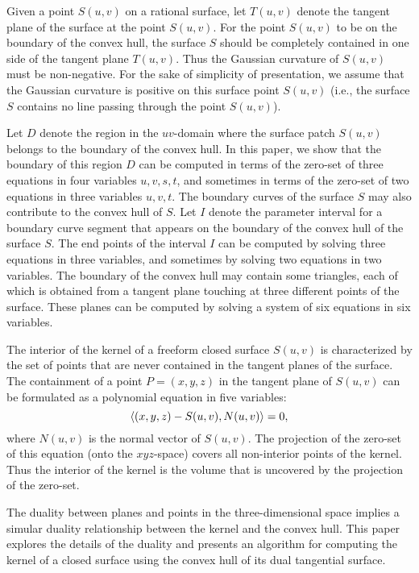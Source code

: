 \documentclass[doublespacing]{elsart}
\begin{document}
Given a point $S(u,v)$ on a rational surface, let $T(u,v)$ denote
the tangent plane of the surface at the point $S(u,v)$.
For the point $S(u,v)$ to be on the boundary of the convex hull,
the surface $S$ should be completely contained in one side of
the tangent plane $T(u,v)$.  Thus the Gaussian curvature of $S(u,v)$ 
must be non-negative.  For the sake of simplicity of presentation,
we assume that the Gaussian curvature is positive
on this surface point $S(u,v)$ (i.e., the surface $S$ contains
no line passing through the point $S(u,v)$).

Let $D$ denote the region in the $uv$-domain where the surface
patch $S(u,v)$ belongs to the boundary of the convex hull.
In this paper, we show that the boundary of this region $D$
can be computed in terms of the zero-set of three equations in
four variables $u,v,s,t$, and sometimes in terms of the zero-set of
two equations in three variables $u,v,t$.  The boundary curves
of the surface $S$ may also contribute to the convex hull of $S$.
Let $I$ denote the parameter interval for a boundary curve segment
that appears on the boundary of the convex hull of the surface $S$.
The end points of the interval $I$ can be computed
by solving three equations in three variables,
and sometimes by solving two equations in two variables.
The boundary of the convex hull may contain some triangles,
each of which is obtained from a tangent plane touching at three 
different points of the surface.  These planes can be computed
by solving a system of six equations in six variables.

The interior of the kernel of a freeform closed surface $S(u,v)$
is characterized by the set of points that are never contained
in the tangent planes of the surface.  The containment of
a point $P = (x,y,z)$ in the tangent plane of $S(u,v)$ can be
formulated as a polynomial equation in five variables:
\[
\left<{(x,y,z)-S(u,v)}, {N(u,v)} \right> = 0,
\]
where $N(u,v)$ is the normal vector of $S(u,v)$.
The projection of the zero-set of this equation
(onto the $xyz$-space) covers all non-interior points of the kernel.
Thus the interior of the kernel is the volume
that is uncovered by the projection of the zero-set.

The duality between planes and points in the three-dimensional space
implies a simular duality relationship between the kernel and
the convex hull.  This paper explores the details of the duality
and presents an algorithm for computing the kernel of a closed surface
using the convex hull of its dual tangential surface.
\end{document}
